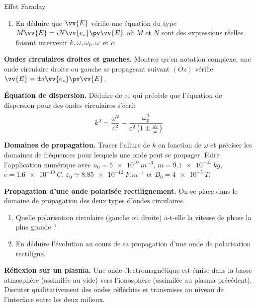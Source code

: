 \begin{exo}[PC]{Effet Faraday}
\begin{quest}
\begin{enumerate}
\item En déduire que $\vv{E}$ vérifie une équation du type $M\vv{E}=iN\vv{e_z}\pv\vv{E}$ où $M$ et $N$ sont des expressions réelles faisant intervenir $k,\omega,\omega_{\rm{p}},\omega$ et $c$.
\end{enumerate}
\item \textbf{Ondes circulaires droites et gauches.}
Montrer qu'en notation complexe, une onde circulaire droite ou gauche se propageant suivant $(Oz)$ vérifie $\vv{E}=\pm i\vv{e_z}\pv\vv{E}$.
\item \textbf{Équation de dispersion.}
Déduire de ce qui précède que l'équation de dispersion pour des ondes circulaires s'écrit
\begin{equation*}
k^2=\frac{\omega^2}{c^2}-\frac{\omega_{\rm{p}}^2}{c^2\left(1\pm\frac{\omega_{\rm{c}}}{\omega}\right)}
\end{equation*}
\item \textbf{Domaines de propagation.}
Tracer l'allure de $k$ en fonction de $\omega$ et préciser les domaines de fréquences pour lesquels une onde peut se propager. Faire l'application numérique avec $n_0=\SI{5e10}{m^{-3}}$, $m=\SI{9,1e-31}{kg}$, $e=\SI{1,6e-19}{C}$, $\varepsilon_0\simeq\SI{8,85e-12}{F.m^{-1}}$ et $B_0=\SI{4e-5}{T}$.
\item \textbf{Propagation d'une onde polarisée rectilignement.} On se place dans le domaine de propagation des deux types d'ondes circulaires.
\begin{enumerate}
\item Quelle polarisation circulaire (gauche ou droite) a-t-elle la vitesse de phase la plus grande ?
\item En déduire l'évolution au cours de sa propagation d'une onde de polarisation rectiligne.
\end{enumerate}
\item \textbf{Réflexion sur un plasma.}
Une onde électromagnétique est émise dans la basse atmosphère (assimilée au vide) vers l'ionosphère (assimilée au plasma précédent). Discuter qualitativement des ondes réfléchies et transmises au niveau de l'interface entre les deux milieux.
\end{quest}
\end{exo}

